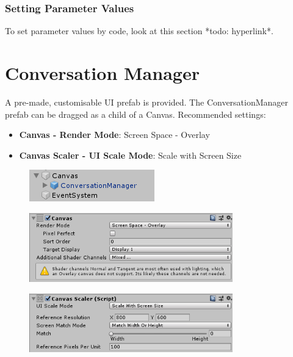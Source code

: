 \documentclass[a4paper,12pt]{article}
\begin{document}
\subsubsection{Setting Parameter Values}
To set parameter values by code, look at this section *todo: hyperlink*. 

\newpage


\section{Conversation Manager}
\hypertarget{_conversationmanager}{}
A pre-made, customisable UI prefab is provided. The ConversationManager prefab can be dragged as a child of a Canvas. 
\newline
Recommended settings:
\begin{itemize}
\setlength\itemsep{1pt}
	\item \textbf{Canvas - Render Mode}: Screen Space - Overlay
	\item \textbf{Canvas Scaler - UI Scale Mode}: Scale with Screen Size
\end{itemize}

\begin{figure}[h]
\centering
\includegraphics[keepaspectratio]{img/CanvasInHierarchy.png}
\end{figure}

\begin{figure}[h]
\centering
\includegraphics[width=250pt, keepaspectratio]{img/CanvasComponent.png}
\end{figure}


\begin{figure}[h]
\centering
\includegraphics[width=250pt, keepaspectratio]{img/CanvasScalarComponent.png}
\end{figure}
\end{document}
